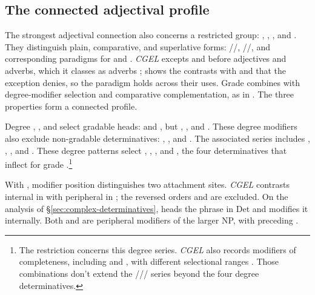 \documentclass[12pt]{article}
\begin{document}
\subsection{The connected adjectival profile}\label{sec:adjectival-profile}

The strongest adjectival connection also concerns a restricted group: , , , and . They distinguish plain, comparative, and superlative forms: /\allowbreak{}/\allowbreak{}, /\allowbreak{}/\allowbreak{}, and corresponding paradigms for  and  \citep[391--395]{huddleston2002}. \textit{CGEL} excepts  and  before adjectives and adverbs, which it classes as adverbs \citep[395, 1123]{huddleston2002}; \textcite{reynolds2024why} shows the contrasts with  and  that the exception denies, so the paradigm holds across their uses. Grade combines with degree-modifier selection and comparative complementation, as in . The three properties form a connected profile.

Degree , , and  select gradable heads:  and , but , , and . These degree modifiers also exclude non-gradable determinatives: , , and . The associated series includes , , , and . These degree patterns select , , , and , the four determinatives that inflect for grade \citep[393--395, 431--432]{huddleston2002}.\footnote{The restriction concerns this degree series. \textit{CGEL} also records modifiers of completeness, including  and , with different selectional ranges \citep[432]{huddleston2002}. Those combinations don't extend the /// series beyond the four degree determinatives.}

With , modifier position distinguishes two attachment sites. \textit{CGEL} contrasts internal  in  with peripheral  in  \citep[p.~392, (61)]{huddleston2002}; the reversed orders  and  are excluded. On the analysis of §\ref{sec:complex-determinatives},  heads the phrase in Det and  modifies it internally. Both  and  are peripheral modifiers of the larger NP, with  preceding .
\end{document}
